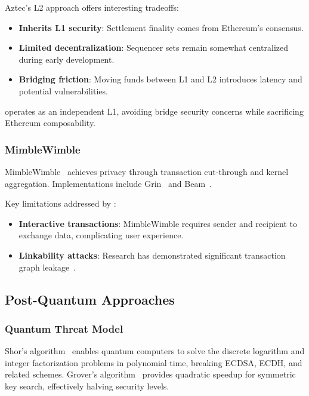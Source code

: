 Aztec's L2 approach offers interesting tradeoffs:
\begin{itemize}
  \item \textbf{Inherits L1 security}: Settlement finality comes from
    Ethereum's consensus.
  \item \textbf{Limited decentralization}: Sequencer sets remain somewhat
    centralized during early development.
  \item \textbf{Bridging friction}: Moving funds between L1 and L2 introduces
    latency and potential vulnerabilities.
\end{itemize}

\Botho operates as an independent L1, avoiding bridge security concerns while
sacrificing Ethereum composability.

\subsubsection{MimbleWimble}

MimbleWimble~\cite{mimblewimble} achieves privacy through transaction
cut-through and kernel aggregation. Implementations include Grin~\cite{grin} and Beam~\cite{beam}.

Key limitations addressed by \Botho:
\begin{itemize}
  \item \textbf{Interactive transactions}: MimbleWimble requires sender and
    recipient to exchange data, complicating user experience.
  \item \textbf{Linkability attacks}: Research has demonstrated significant
    transaction graph leakage~\cite{mw-attack}.
\end{itemize}

\subsection{Post-Quantum Approaches}

\subsubsection{Quantum Threat Model}

Shor's algorithm~\cite{shor} enables quantum computers to solve the discrete
logarithm and integer factorization problems in polynomial time, breaking
ECDSA, ECDH, and related schemes. Grover's algorithm~\cite{grover} provides
quadratic speedup for symmetric key search, effectively halving security
levels.

